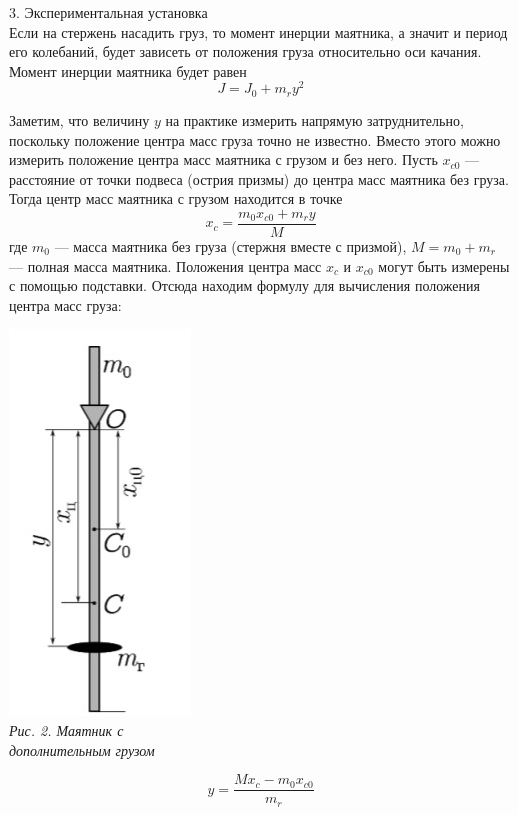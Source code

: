 \documentclass[12pt, a4paper]{article}
\begin{document}
        {\Large 3. Экспериментальная установка \\}
        Если на стержень насадить груз, то момент инерции маятника, а значит
        и период его колебаний, будет зависеть от положения груза относительно
        оси качания. Момент инерции маятника будет равен
        \begin{displaymath}
            J = J_0 + m_ry^2
        \end{displaymath}
        \noindent\begin{minipage}[c]{0.67\textwidth}
            \hspace{1cm}
            Заметим, что величину $𝑦$ на практике измерить напрямую затруднительно, поскольку положение центра масс
            груза точно не известно. Вместо этого можно измерить
            положение центра масс маятника с грузом и без него.
            Пусть $𝑥_{c0}$ --- расстояние от точки подвеса (острия
            призмы) до центра масс маятника без груза. Тогда центр
            масс маятника с грузом находится в точке
            \begin{displaymath}
                x_c = \frac{m_0x_{c0} + m_ry}{M}
            \end{displaymath}
            где $𝑚_0$ — масса маятника без груза (стержня вместе с
            призмой), $𝑀 = 𝑚_0 + 𝑚_r$ — полная масса маятника. Положения центра масс $x_c$ и $𝑥_{c0}$ могут быть измерены с
            помощью подставки. Отсюда находим формулу для вычисления положения центра масс груза:
        \end{minipage}
        \begin{minipage}[c]{0.32\textwidth}
            \begin{center}
                \includegraphics[scale=0.6]{Pics/picture2.jpg} \\
                \textit{\textcolor[HTML]{000000}{Рис. 2. Маятник с \\ дополнительным грузом}}
            \end{center}
        \end{minipage}
        \begin{equation}
            y = \frac{Mx_c - m_0x_{c0}}{m_r}
        \end{equation}
\end{document}
